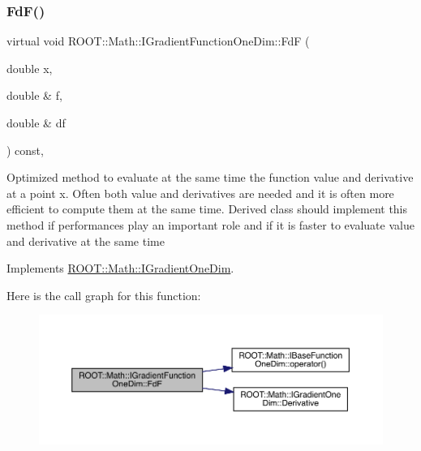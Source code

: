 \subsubsection{\texorpdfstring{FdF()}{FdF()}\hspace{0.1cm}{\footnotesize\ttfamily [2/3]}}
{\footnotesize\ttfamily virtual void R\+O\+O\+T\+::\+Math\+::\+I\+Gradient\+Function\+One\+Dim\+::\+FdF (\begin{DoxyParamCaption}\item[{double}]{x,  }\item[{double \&}]{f,  }\item[{double \&}]{df }\end{DoxyParamCaption}) const\hspace{0.3cm}{\ttfamily [inline]}, {\ttfamily [virtual]}}

Optimized method to evaluate at the same time the function value and derivative at a point x. Often both value and derivatives are needed and it is often more efficient to compute them at the same time. Derived class should implement this method if performances play an important role and if it is faster to evaluate value and derivative at the same time 

Implements \mbox{\hyperlink{classROOT_1_1Math_1_1IGradientOneDim_aef5560ea7d43e64d94bf875713e2a5fc}{R\+O\+O\+T\+::\+Math\+::\+I\+Gradient\+One\+Dim}}.

Here is the call graph for this function\+:
\nopagebreak
\begin{figure}[H]
\begin{center}
\leavevmode
\includegraphics[width=350pt]{d5/d75/classROOT_1_1Math_1_1IGradientFunctionOneDim_a01eaedb2ae1dfa5722f11281acf7a72b_cgraph}
\end{center}
\end{figure}
\mbox{\label{classROOT_1_1Math_1_1IGradientFunctionOneDim_a01eaedb2ae1dfa5722f11281acf7a72b}} 
